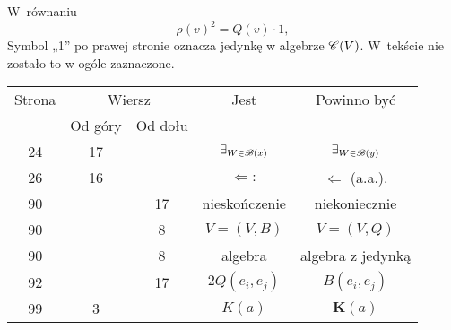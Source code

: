 \documentclass[a4paper,11pt]{article}
\begin{document}
\newpage


\vspace{0em}



\vspace{0em}


\noindent
{} W~równaniu
\begin{equation}
  \label{eq:MaurinAnalizaOgolneStrukturyVolII-01}
  \rho( v )^{ 2 } = Q( v ) \cdot 1,
\end{equation}
Symbol „1” po prawej stronie oznacza jedynkę w algebrze $\mathcal{C}( V )$.
W~tekście nie zostało to w ogóle zaznaczone.





\newpage


\begin{center}

  \begin{tabular}{|c|c|c|c|c|}
    \hline
    Strona & \multicolumn{2}{c|}{Wiersz} & Jest
                              & Powinno być \\ \cline{2-3}
    & Od góry & Od dołu & & \\
    \hline
    24  & 17 & & $\exists_{ \substack{ W \in \mathcal{B}( x ) } }$
           & $\exists_{ \substack{ W \in \mathcal{B}( y ) } }$ \\
    26  & 16 & & $\Leftarrow:$ & $\Leftarrow$ (a.a.). \\
    90  & & 17 & nieskończenie & niekoniecznie \\
    90  & & \hphantom{0}8 & $V = ( V, B )$ & $V = ( V, Q )$ \\
    90  & & \hphantom{0}8 & algebra & algebra z jedynką \\
    92  & & 17 & $2Q( e_{ i }, e_{ j } )$ & $B( e_{ i }, e_{ j } )$ \\
    99  & \hphantom{0}3 & & $K( a )$ & $\mathbf{K}( a )$ \\
    \hline
  \end{tabular}

\end{center}
\end{document}
